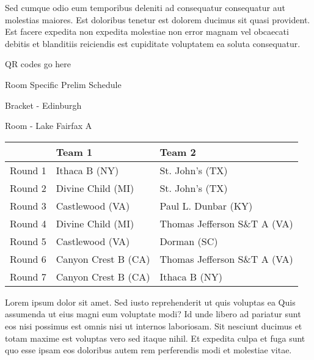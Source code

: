 \documentclass{article}%
\begin{document}
\newline%
Sed cumque odio eum temporibus deleniti ad consequatur consequatur aut molestias maiores. Est doloribus tenetur est dolorem ducimus sit quasi provident. Est facere expedita non expedita molestiae non error magnam vel obcaecati debitis et blanditiis reiciendis est cupiditate voluptatem ea soluta consequatur.%
\vspace*{140pt}%
\begin{center}%
\begin{Huge}%
QR codes go here%
\end{Huge}%
\end{center}%
\newpage%
\begin{center}%
\begin{Huge}%
Room Specific Prelim Schedule%
\end{Huge}%
\vspace*{8pt}%
\linebreak%
\begin{Large}%
Bracket {-} Edinburgh%
\end{Large}%
\vspace*{8pt}%
\linebreak%
\vspace*{8pt}%
\begin{Large}%
Room {-} Lake Fairfax A%
\end{Large}%
\end{center}%
%
\begin{tabularx}{\textwidth}{|c|Y|Y|}%
\hline%
&Team 1&Team 2\\%
\hline%
Round 1&Ithaca B (NY)&St. John's (TX)\\%
Round 2&Divine Child (MI)&St. John's (TX)\\%
Round 3&Castlewood (VA)&Paul L. Dunbar (KY)\\%
Round 4&Divine Child (MI)&Thomas Jefferson S\&T A (VA)\\%
Round 5&Castlewood (VA)&Dorman (SC)\\%
Round 6&Canyon Crest B (CA)&Thomas Jefferson S\&T A (VA)\\%
Round 7&Canyon Crest B (CA)&Ithaca B (NY)\\%
\hline%
\end{tabularx}%
\vspace*{8pt}%
\newline%
Lorem ipsum dolor sit amet. Sed iusto reprehenderit ut quis voluptas ea Quis assumenda ut eius magni eum voluptate modi? Id unde libero ad pariatur sunt eos nisi possimus est omnis nisi ut internos laboriosam. Sit nesciunt ducimus et totam maxime est voluptas vero sed itaque nihil. Et expedita culpa et fuga sunt quo esse ipsam eos doloribus autem rem perferendis modi et molestiae vitae.\newline%
\end{document}

